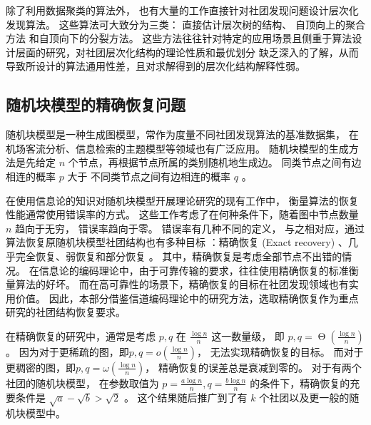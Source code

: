 除了利用数据聚类的算法外，
也有大量的工作直接针对社团发现问题设计层次化发现算法。
这些算法可大致分为三类\cite{li2022hierarchical}：
直接估计层次树的结构\cite{arenas2006synchronization, blundell2013bhcd}、
自顶向上的聚合方法\cite{clauset2004finding}
和自顶向下的分裂方法\cite{girvan2002community, dasgupta2016cost}。
{这些方法往往针对特定的应用场景且侧重于算法设计层面的研究，对社团层次化结构的理论性质和最优划分
缺乏深入的了解，从而导致所设计的算法通用性差，且对求解得到的层次化结构解释性弱。}

\subsection{随机块模型的精确恢复问题}
随机块模型是一种生成图模型，常作为度量不同社团发现算法的基准数据集，
在机场客流分析\cite{zhao2016rfla}、信息检索的主题模型\cite{Gerlach_2018}等领域也有广泛应用。
随机块模型的生成方法是先给定 $n$ 个节点，再根据节点所属的类别随机地生成边。
同类节点之间有边相连的概率  $p$ 大于
不同类节点之间有边相连的概率 $q$ \cite{abbe2017community}。

在使用信息论的知识对随机块模型开展理论研究的现有工作中，
衡量算法的恢复性能通常使用错误率的方式。
这些工作考虑了在何种条件下，随着图中节点数量 $n$ 趋向于无穷，
错误率趋向于零。
错误率有几种不同的定义，
与之相对应，通过算法恢复原随机块模型社团结构也有多种目标
：精确恢复 (Exact recovery) 、几乎完全恢复、弱恢复和部分恢复
\cite{abbe2017community}。
其中，精确恢复是考虑全部节点不出错的情况。
在信息论的编码理论中，由于可靠传输的要求，往往使用精确恢复的标准衡量算法的好坏。
而在高可靠性的场景下，精确恢复的目标在社团发现领域也有实用价值。
因此，本部分借鉴信道编码理论中的研究方法，选取精确恢复作为重点研究的社团结构恢复要求。


在精确恢复的研究中，通常是考虑 $p, q$ 在 $\frac{\log n}{n}$ 这一数量级，
即 $p,q=\upTheta \left(\frac{\log n}{n} \right)$。
因为对于更稀疏的图，即$p, q=o\left(\frac{\log n}{n} \right)$，
无法实现精确恢复的目标。
而对于更稠密的图，即$p,q=\omega\left(\frac{\log n}{n} \right)$，
精确恢复的误差总是衰减到零的。
对于有两个社团的随机块模型，
在参数取值为 $p=\frac{a \log n}{n}, q = \frac{b \log n }{n}$
的条件下，精确恢复的充要条件是
$\sqrt{a} - \sqrt{b} > \sqrt{2}$ \cite{abbe2015exact, mossel2016}。
这个结果随后推广到了有 $k$ 个社团以及更一般的随机块模型中\cite{abbe2015community}。

